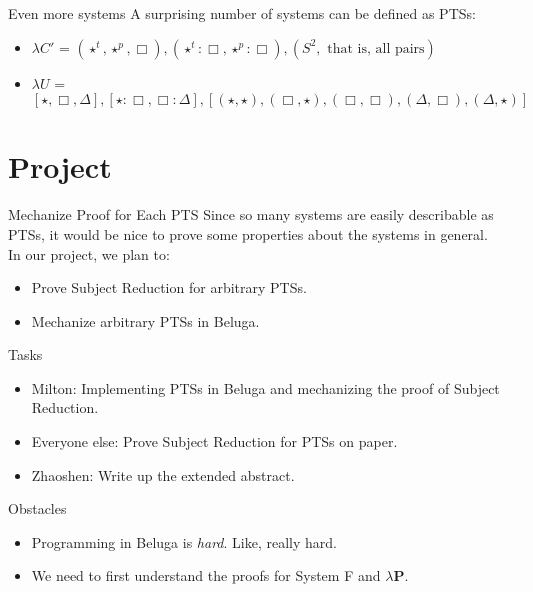 \documentclass{beamer}
\begin{document}
    \begin{frame}{Even more systems}
        A surprising number of systems can be defined as PTSs:
        \begin{itemize}\small
            \item<1-> $\lambda C'$ = $(\star^t, \star^p, \Box), (\star^t : \Box, \star^p : \Box), (S^2, \text{ that is, all pairs})$
            \item<2-> $\lambda U$ = $[\star, \Box, \Delta], [\star : \Box, \Box : \Delta], [(\star, \star), (\Box, \star), (\Box, \Box), (\Delta, \Box), (\Delta, \star)]$
        \end{itemize}
    \end{frame}

    \section{Project}

    \begin{frame}{Mechanize Proof for Each PTS}
        Since so many systems are easily describable as PTSs, it would be nice to prove some properties about the systems in general. \\[0.05in]
        In our project, we plan to: 
        \begin{itemize}
            \item<1-> Prove Subject Reduction for arbitrary PTSs.
            \item<2-> Mechanize arbitrary PTSs in Beluga.
        \end{itemize}
    \end{frame}

    \begin{frame}{Tasks}
        \begin{itemize}
            \item<1-> Milton: Implementing PTSs in Beluga and mechanizing the proof of Subject Reduction.
            \item<2-> Everyone else: Prove Subject Reduction for PTSs on paper.
            \item<3-> Zhaoshen: Write up the extended abstract.
        \end{itemize}
    \end{frame}

    \begin{frame}{Obstacles}
        \begin{itemize}
            \item<1-> Programming in Beluga is \textit{hard}. \pause Like, really hard.
                \pause
            \item<2-> We need to first understand the proofs for System \textsf{F} and $\lambda\mathbf{P}$.
        \end{itemize}
    \end{frame}
\end{document}
